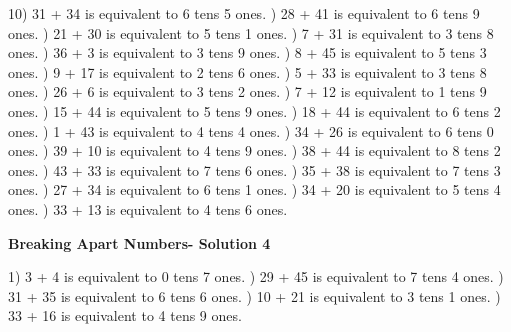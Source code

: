 \documentclass{article}%
\begin{document}
10) 31 + 34 is equivalent to 6 tens 5 ones.%
) 28 + 41 is equivalent to 6 tens 9 ones.%
) 21 + 30 is equivalent to 5 tens 1 ones.%
) 7 + 31 is equivalent to 3 tens 8 ones.%
) 36 + 3 is equivalent to 3 tens 9 ones.%
) 8 + 45 is equivalent to 5 tens 3 ones.%
) 9 + 17 is equivalent to 2 tens 6 ones.%
) 5 + 33 is equivalent to 3 tens 8 ones.%
) 26 + 6 is equivalent to 3 tens 2 ones.%
) 7 + 12 is equivalent to 1 tens 9 ones.%
) 15 + 44 is equivalent to 5 tens 9 ones.%
) 18 + 44 is equivalent to 6 tens 2 ones.%
) 1 + 43 is equivalent to 4 tens 4 ones.%
) 34 + 26 is equivalent to 6 tens 0 ones.%
) 39 + 10 is equivalent to 4 tens 9 ones.%
) 38 + 44 is equivalent to 8 tens 2 ones.%
) 43 + 33 is equivalent to 7 tens 6 ones.%
) 35 + 38 is equivalent to 7 tens 3 ones.%
) 27 + 34 is equivalent to 6 tens 1 ones.%
) 34 + 20 is equivalent to 5 tens 4 ones.%
) 33 + 13 is equivalent to 4 tens 6 ones.%
\newline%
\newpage%
\large%
\begin{center}%
\textbf{Breaking Apart Numbers- Solution 4}%
\newline%
\end{center} \normalsize%
1) 3 + 4 is equivalent to 0 tens 7 ones.%
) 29 + 45 is equivalent to 7 tens 4 ones.%
) 31 + 35 is equivalent to 6 tens 6 ones.%
) 10 + 21 is equivalent to 3 tens 1 ones.%
) 33 + 16 is equivalent to 4 tens 9 ones.%
\end{document}
